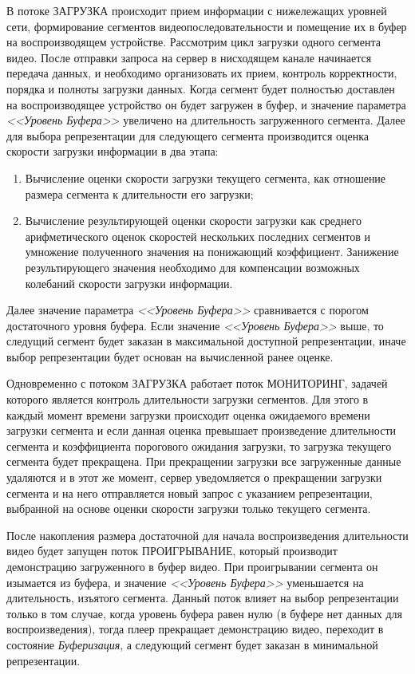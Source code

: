 В потоке ЗАГРУЗКА происходит прием информации с нижележащих уровней сети, формирование сегментов видеопоследовательности и помещение их в буфер на воспроизводящем устройстве. Рассмотрим цикл загрузки одного сегмента видео. После отправки запроса на сервер в нисходящем канале начинается передача данных, и необходимо организовать их прием, контроль корректности, порядка и полноты загрузки данных. Когда сегмент будет полностью доставлен на воспроизводящее устройство он будет загружен в буфер, и значение параметра \textit{<<Уровень Буфера>>} увеличено на длительность загруженного сегмента. Далее для выбора репрезентации для следующего сегмента производится оценка скорости загрузки информации в два этапа:
\begin{enumerate}
  \item Вычисление оценки скорости загрузки текущего сегмента, как отношение размера сегмента к длительности его загрузки;
  \item Вычисление результирующей оценки скорости загрузки как среднего арифметического оценок скоростей нескольких последних сегментов и умножение полученного значения на понижающий коэффициент. Занижение результирующего значения необходимо для компенсации возможных колебаний скорости загрузки информации.
\end{enumerate}
Далее значение параметра \textit{<<Уровень Буфера>>} сравнивается с порогом достаточного уровня буфера. Если значение \textit{<<Уровень Буфера>>} выше, то следущий сегмент будет заказан в максимальной доступной репрезентации, иначе выбор репрезентации будет основан на вычисленной ранее оценке.

Одновременно с потоком ЗАГРУЗКА работает поток МОНИТОРИНГ, задачей которого является контроль длительности загрузки сегментов. Для этого в каждый момент времени загрузки происходит оценка ожидаемого времени загрузки сегмента и если данная оценка превышает произведение длительности сегмента и коэффициента порогового ожидания загрузки, то загрузка текущего сегмента будет прекращена. При прекращении загрузки все загруженные данные удаляются и в этот же момент, сервер уведомляется о прекращении загрузки сегмента и на него отправляется новый запрос с указанием репрезентации, выбранной на основе оценки скорости загрузки только текущего сегмента.

После накопления размера достаточной для начала воспроизведения длительности видео будет запущен поток ПРОИГРЫВАНИЕ, который производит демонстрацию загруженного в буфер видео. При проигрывании сегмента он изымается из буфера, и значение \textit{<<Уровень Буфера>>} уменьшается на длительность, изъятого сегмента. Данный поток влияет на выбор репрезентации только в том случае, когда уровень буфера равен нулю (в буфере нет данных для воспроизведения), тогда плеер прекращает демонстрацию видео, переходит в состояние \textit{Буферизация}, а следующий сегмент будет заказан в минимальной репрезентации.

